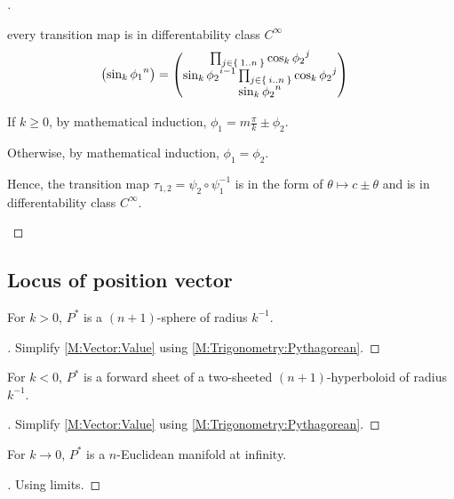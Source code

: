 \documentclass[../main.tex]{subfiles}
\begin{document}
\begin{proof}[]
\begin{subproof}{every transition map is in differentability class $C^\infty$}
\begin{align*}
\begin{pmatrix}
                \sin_k{{\tensor{{\phi_1}}{^n}}}                                                        \\
            \end{pmatrix}
                                                                                                                      & =
            \begin{pmatrix}
                \prod_{j\in\Set{1..n}}{\cos_k{\tensor{{\phi_2}}{^j}}}                                  \\
                \sin_k{\tensor{{\phi_2}}{^{i-1}}}\prod_{j\in\Set{i..n}}{\cos_k{\tensor{{\phi_2}}{^j}}} \\
                \sin_k{{\tensor{{\phi_2}}{^n}}}                                                        \\
            \end{pmatrix}
        \end{align*}

        If $k\ge 0$, by mathematical induction, $\phi_1 = m\frac{\pi}{k}\pm\phi_2$.

        Otherwise, by mathematical induction, $\phi_1 = \phi_2$.

        Hence, the transition map $\tau_{1,2} = \psi_2 \circ \psi_1^{-1}$
        is in the form of $\theta \mapsto c\pm\theta$
        and is in differentability class $C^\infty$.
    \end{subproof}
\end{proof}
\subsection{Locus of position vector}
\begin{lemma}\label{SphericalLocus}
    For $k>0$, $P^\ast$ is a $\left(n+1\right)$-sphere of radius $k^{-1}$.
\end{lemma}
\begin{proof}[]
    Simplify \cref{M:Vector:Value} using \cref{M:Trigonometry:Pythagorean}.
\end{proof}
\begin{lemma}\label{HyperbolicLocus}
    For $k<0$, $P^\ast$ is a forward sheet of a two-sheeted $\left(n+1\right)$-hyperboloid of radius $k^{-1}$.
\end{lemma}
\begin{proof}[]
    Simplify \cref{M:Vector:Value} using \cref{M:Trigonometry:Pythagorean}.
\end{proof}
\begin{lemma}\label{EuclideanLocus}
    For $k\to0$, $P^\ast$ is a $n$-Euclidean manifold at infinity.
\end{lemma}
\begin{proof}[]
    Using limits.
\end{proof}
\end{document}

